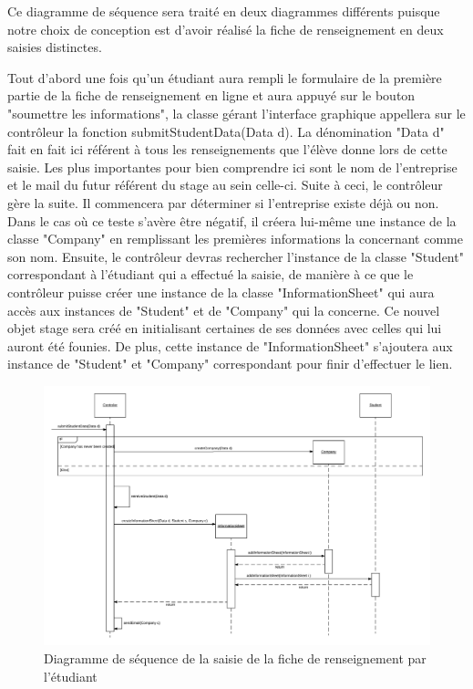 \documentclass{scrreprt}
\begin{document}
	Ce diagramme de séquence sera traité en deux diagrammes différents puisque notre choix de conception est d'avoir réalisé
la fiche de renseignement en deux saisies distinctes.

	Tout d'abord une fois qu'un étudiant aura rempli le formulaire de la première partie de la fiche de renseignement en ligne et aura
appuyé sur le bouton "soumettre les informations", la classe gérant l'interface graphique appellera sur le contrôleur la fonction 
submitStudentData(Data d). La dénomination "Data d" fait en fait ici référent à tous les renseignements que l'élève donne lors de 
cette saisie. Les plus importantes pour bien comprendre ici sont le nom de l'entreprise et le mail du futur référent du stage au sein
celle-ci. Suite à ceci, le contrôleur gère la suite. Il commencera par déterminer si l'entreprise existe déjà ou non. Dans le cas où
ce teste s'avère être négatif, il créera lui-même une instance de la classe "Company" en remplissant les premières informations la 
concernant comme son nom. Ensuite, le contrôleur devras rechercher l'instance de la classe "Student" correspondant à l'étudiant qui
a effectué la saisie, de manière à ce que le contrôleur puisse créer une instance de la classe "InformationSheet" qui aura accès aux instances
de "Student" et de "Company" qui la concerne. Ce nouvel objet stage sera créé en initialisant certaines de ses données avec celles qui lui
auront été founies. De plus, cette instance de "InformationSheet" s'ajoutera aux instance de "Student" et "Company" correspondant pour finir 
d'effectuer le lien.

\newpage
\begin{figure}[h]
\centering
\includegraphics[width=15cm]{images/submitStudentSeqDiagram.png}
\caption{Diagramme de séquence de la saisie de la fiche de renseignement par l'étudiant}
\end{figure}
\end{document}
